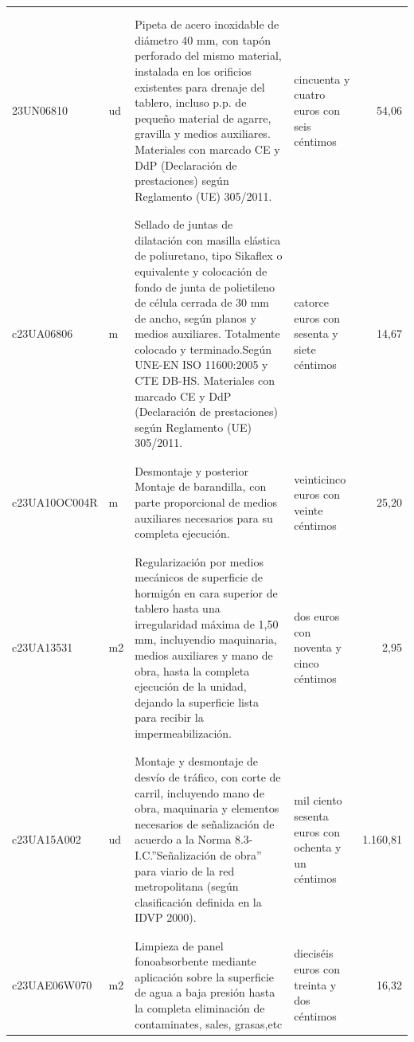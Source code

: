 \begin{supertabular}{|l|l|p{5cm}|p{3cm}|r|}
&&&&\\%
&&&&\\%
23UN06810&ud&Pipeta de acero inoxidable de diámetro 40 mm, con tapón perforado del mismo material, instalada en los orificios existentes para drenaje del tablero, incluso p.p. de pequeño material de agarre, gravilla y medios auxiliares. Materiales con marcado CE y DdP (Declaración de prestaciones) según Reglamento (UE) 305/2011.&cincuenta y cuatro euros con seis céntimos&54,06\\%
&&&&\\%
&&&&\\%
c23UA06806&m&Sellado de juntas de dilatación con masilla elástica de poliuretano, tipo Sikaflex o equivalente y colocación de fondo de junta de polietileno de célula cerrada de 30 mm de ancho, según planos y medios auxiliares. Totalmente colocado y terminado.Según UNE{-}EN ISO 11600:2005 y CTE DB{-}HS. Materiales con marcado CE y DdP (Declaración de prestaciones) según Reglamento (UE) 305/2011.&catorce euros con sesenta y siete céntimos&14,67\\%
&&&&\\%
&&&&\\%
c23UA10OC004R&m&Desmontaje y posterior Montaje de barandilla, con parte proporcional de medios auxiliares necesarios para su completa ejecución.&veinticinco euros con veinte céntimos&25,20\\%
&&&&\\%
&&&&\\%
c23UA13531&m2&Regularización por medios mecánicos de superficie de hormigón en cara superior de tablero hasta una irregularidad máxima de 1,50 mm, incluyendio maquinaria, medios auxiliares y mano de obra, hasta la completa ejecución de la unidad, dejando la superficie lista para recibir la impermeabilización.&dos euros con noventa y cinco céntimos&2,95\\%
&&&&\\%
&&&&\\%
c23UA15A002&ud&Montaje y desmontaje de desvío de tráfico, con corte de carril, incluyendo mano de obra, maquinaria y elementos necesarios de señalización de acuerdo a la Norma 8.3{-}I.C.”Señalización de obra” para viario de la red metropolitana (según clasificación definida en la IDVP 2000).&mil ciento sesenta euros con ochenta y un céntimos&1.160,81\\%
&&&&\\%
&&&&\\%
c23UAE06W070&m2&Limpieza de panel fonoabsorbente mediante aplicación sobre la superficie de agua a baja presión hasta la completa eliminación de contaminates, sales, grasas,etc &dieciséis euros con treinta y dos céntimos&16,32\\%

\end{supertabular}
